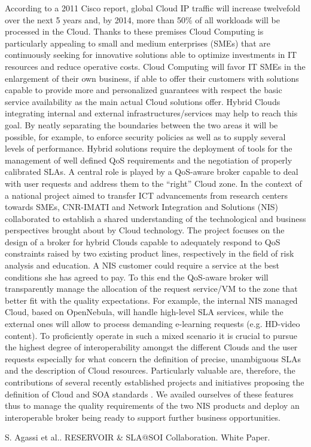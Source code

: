 According to a 2011 Cisco report, global Cloud IP traffic will increase twelvefold over the next 5 years and, by 2014, more than 50\% of all workloads will be processed in the Cloud. Thanks to these premises Cloud Computing is particularly appealing to small and medium enterprises (SMEs) that are continuously seeking for innovative solutions able to optimize investments in IT resources and reduce operative costs. 
Cloud Computing will favor IT SMEs in the enlargement of their own business,  if able to offer their customers with solutions capable to provide more and personalized guarantees with respect the basic service availability as the  main actual Cloud solutions offer.
Hybrid Clouds integrating internal  and external infrastructures/services may help to reach this goal. By neatly separating the boundaries between the two areas it will be possible, for example, to enforce security policies as well as to supply several levels of performance. Hybrid solutions require the deployment of tools for the management of well defined QoS requirements and the negotiation of properly calibrated SLAs. A central role is played by a QoS-aware broker capable to deal with user requests and address them to the ``right'' Cloud zone.
In the context of a national project aimed to transfer ICT advancements from research centers towards SMEs, CNR-IMATI and Network Integration and Solutions (NIS) collaborated to establish a shared understanding of the technological and business perspectives brought about by Cloud technology.  The project focuses on the design of a broker for hybrid Clouds capable to adequately respond to QoS constraints raised by two existing product lines, respectively in the field of risk analysis and education. A NIS customer could require a service at the best conditions she has agreed to pay. To this end the QoS-aware broker will transparently manage the allocation of the request service/VM to the zone that better fit with the quality expectations. For example, the internal NIS managed Cloud, based on OpenNebula, will handle high-level SLA services, while the external ones will allow to process demanding e-learning  requests (e.g. HD-video content).
To proficiently operate in such a mixed scenario it is crucial to pursue the highest degree of interoperability amongst the different Clouds and the user requests especially for what concern the definition of precise, unambiguous SLAs and the description of Cloud resources. Particularly valuable are, therefore, the contributions of several recently established projects and initiatives proposing the definition of Cloud and SOA standards \cite{WP}. We availed ourselves of these features thus to manage the quality requirements of the two NIS products and deploy an interoperable broker being ready to support further business opportunities. 


\begin{thebibliography}{10}

{\sc S. Agassi et al.}. {RESERVOIR \& SLA@SOI Collaboration}. White Paper.

\end{thebibliography}

